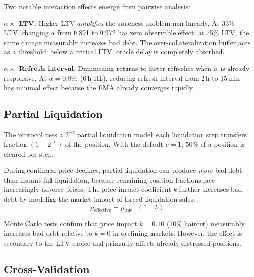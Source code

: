 \documentclass[10pt,a4paper,twocolumn]{article}
\theoremstyle{definition}
\theoremstyle{plain}
\theoremstyle{remark}
\begin{document}
Two notable interaction effects emerge from pairwise analysis:

\textbf{$\alpha \times$ LTV.} Higher LTV \emph{amplifies} the staleness problem non-linearly. At 33\% LTV, changing $\alpha$ from 0.891 to 0.972 has zero observable effect; at 75\% LTV, the same change measurably increases bad debt. The over-collateralization buffer acts as a threshold: below a critical LTV, oracle delay is completely absorbed.

\textbf{$\alpha \times$ Refresh interval.} Diminishing returns to faster refreshes when $\alpha$ is already responsive. At $\alpha = 0.891$ (6\,h HL), reducing refresh interval from 2\,h to 15\,min has minimal effect because the EMA already converges rapidly.

\subsection{Partial Liquidation}
\label{sec:bd-partial-liq}

The protocol uses a $2^{-e}$ partial liquidation model: each liquidation step transfers fraction $(1 - 2^{-e})$ of the position. With the default $e = 1$, 50\% of a position is cleared per step.

During continued price declines, partial liquidation can produce \emph{more} bad debt than instant full liquidation, because remaining position fractions face increasingly adverse prices. The price impact coefficient $k$ further increases bad debt by modeling the market impact of forced liquidation sales:
\begin{equation}
p_{\text{effective}} = p_{\text{true}} \cdot (1 - k)
\end{equation}

Monte Carlo tests confirm that price impact $k = 0.10$ (10\% haircut) measurably increases bad debt relative to $k = 0$ in declining markets. However, the effect is secondary to the LTV choice and primarily affects already-distressed positions.

\subsection{Cross-Validation}
\label{sec:bd-validation}
\end{document}

